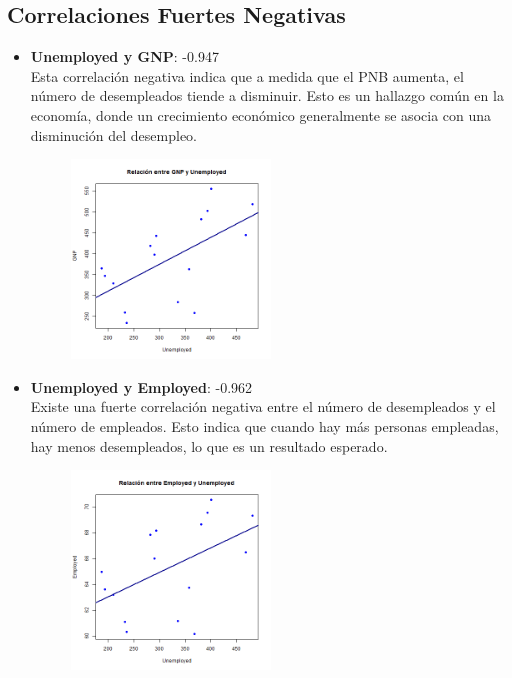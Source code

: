 \documentclass{article}
\begin{document}
\subsection{Correlaciones Fuertes Negativas}

\begin{itemize}
    \item \textbf{Unemployed y GNP}: -0.947\\
    Esta correlación negativa indica que a medida que el PNB aumenta, el número de desempleados tiende a disminuir. Esto es un hallazgo común en la economía, donde un crecimiento económico generalmente se asocia con una disminución del desempleo.
    \begin{figure}[H]
        \centering
        \includegraphics[width=0.5\textwidth]{Graficos_Dispersion/Unemployed_vs_GNP.png}
        \label{fig:Unemployed_vs_GNP}
        \vspace{0.5cm} %
    \end{figure}

    \item \textbf{Unemployed y Employed}: -0.962\\
    Existe una fuerte correlación negativa entre el número de desempleados y el número de empleados. Esto indica que cuando hay más personas empleadas, hay menos desempleados, lo que es un resultado esperado.
    \begin{figure}[H]
        \centering
        \includegraphics[width=0.5\textwidth]{Graficos_Dispersion/Unemployed_vs_Employed.png}
        \label{fig:Unemployed_vs_Employed}
        \vspace{0.5cm} %
    \end{figure}
\end{itemize}
\end{document}
